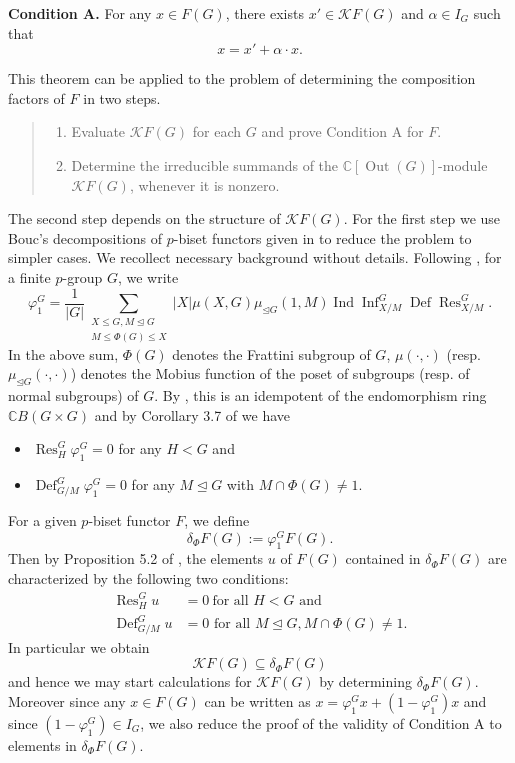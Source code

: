 \documentclass[12pt]{article}
\theoremstyle{plain}
\theoremstyle{definition}
\newcommand{\ind}{\operatorname{Ind}}
\newcommand{\res}{\operatorname{Res}}
\newcommand{\defl}{\operatorname{Def}}
\newcommand{\infl}{\operatorname{Inf}}
\newcommand{\out}{\operatorname{Out}}
\begin{document}
\noindent\textbf{Condition A.} For any $x\in F(G)$, there exists $x'\in\mathcal{K}F(G)$ and $\alpha\in I_G$ such that $$x = x' + \alpha\cdot x.$$

\begin{remark}
    This theorem can be applied to the problem of determining the composition factors of $F$ in two steps.
    \begin{quote}
    \begin{enumerate}
        \item[Step 1.] Evaluate $\mathcal{K}F(G)$ for each $G$ and prove Condition A for $F$.
        \item[Step 2.] Determine the irreducible summands of the $\mathbb C[\out(G)]$-module $\mathcal{K}F(G)$, whenever it is nonzero.
    \end{enumerate}
    \end{quote}
    The second step depends on the structure of $\mathcal{K}F(G)$. For the first step we use Bouc's decompositions of $p$-biset functors given in \cite{Bouc2} to reduce the problem to simpler cases. We recollect necessary background without details. Following \cite{Bouc2}, for a finite $p$-group $G$, we write
        \[
\varphi_1^G =\frac{1}{|G|} \sum_{\substack{X\le G, M\unlhd G\\ M\le \Phi(G)\le X}} |X|\mu(X, G)\mu_{\unlhd G}(1, M)\ind\infl_{X/M}^G\defl\res^G_{X/M}.
        \]
        In the above sum, $\Phi(G)$ denotes the Frattini subgroup of $G$, $\mu(\cdot, \cdot)$ (resp. $\mu_{\unlhd G}(\cdot, \cdot)$) denotes the Mobius function 
        of the poset of subgroups (resp. of normal subgroups) of $G$. 
        By \cite[Theorem 4.8]{Bouc2}, this is an idempotent of the endomorphism ring $\mathbb CB(G\times G)$ and 
        by Corollary 3.7 of \cite{Bouc2} we have 
        \begin{itemize}
            \item $\res^G_H \varphi^G_1 = 0$ for any $H<G$ and
            \item $\defl^G_{G/M}\varphi^G_1 = 0$ for any $M\unlhd G$ with $M\cap \Phi(G) \not = 1$.
        \end{itemize}
        For a given $p$-biset functor $F$, we define
        \[
        \delta_\Phi F(G):= \varphi^G_1 F(G).
        \]
        Then by Proposition 5.2 of \cite{Bouc2}, the elements $u$ of $F(G)$ contained in $\delta_\Phi F(G)$ are characterized by the following two conditions:
        \begin{align}
    \res^G_H u &= 0\ \text{for all } H < G \text{ and} \label{eqn:delta1} \\
    \defl^G_{G/M} u & = 0 \text{ for all } M\unlhd G, M\cap \Phi(G) \not = 1. \label{eqn:delta2}
\end{align}
In particular we obtain 
\[
\mathcal{K}F(G)\subseteq \delta_\Phi F(G)
\]
and hence we may start calculations for $\mathcal{K}F(G)$ by determining $\delta_\Phi F(G)$. Moreover since any $x\in F(G)$ can be written as $x = \varphi^G_1x + (1-\varphi^G_1)x$ and since $(1-\varphi^G_1)\in I_G$, we also reduce the proof of the validity of Condition A to elements in $\delta_\Phi F(G)$.
\end{remark}
\end{document}
